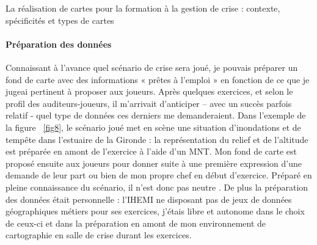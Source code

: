 \documentclass[10pt,a4paper]{report} %
\begin{document}
\begin{part}{La réalisation de cartes pour la formation à la gestion de crise : contexte, spécificités et types de cartes}
\paragraph{Préparation des données}
Connaissant à l’avance quel scénario de crise sera joué, je pouvais préparer un fond de carte avec des informations « prêtes à l’emploi » en fonction de ce que je jugeai pertinent à proposer aux joueurs. Après quelques exercices, et selon le profil des auditeurs-joueurs, il m’arrivait d’anticiper – avec un succès parfois relatif - quel type de données ces derniers me demanderaient. Dans l’exemple de la figure ~\ref{fig8}, le scénario joué met en scène une situation d’inondations et de tempête dans l’estuaire de la Gironde : la représentation du relief et de l’altitude est préparée en amont de l’exercice à l’aide d’un MNT. Mon fond de carte est proposé ensuite aux joueurs pour donner suite à une première expression d’une demande de leur part ou bien de mon propre chef en début d’exercice. Préparé en pleine connaissance du scénario, il n’est donc pas neutre . De plus la préparation des données était personnelle : l’IHEMI ne disposant pas de jeux de données géographiques métiers pour ses exercices, j’étais libre et autonome dans le choix de ceux-ci et dans la préparation en amont de mon environnement de cartographie en salle de crise durant les exercices.


\end{part}
\end{document}
